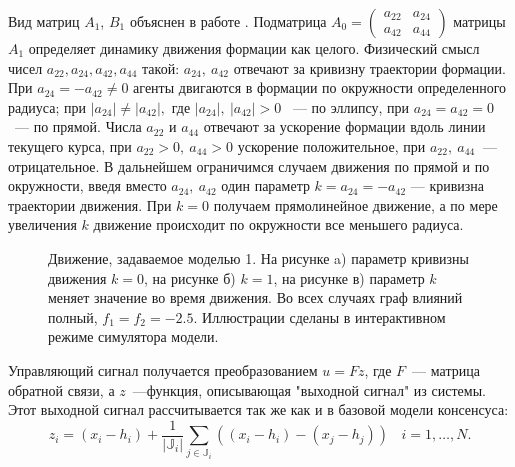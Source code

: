 Вид матриц $A_1$, $B_1$ объяснен в работе \cite{veerman2005flocks}. Подматрица 
$A_0=\left( \begin{array}{cc}
a_{22} & a_{24} \\
a_{42} & a_{44} \end{array} \right)$ 
матрицы $A_1$ определяет динамику движения формации как целого. Физический смысл чисел $a_{22},a_{24},a_{42},a_{44}$ такой: $a_{24},\ a_{42}$ отвечают за кривизну траектории формации. При $a_{24}=-a_{42}\neq 0$ агенты двигаются в формации по окружности определенного радиуса; при $|a_{24}|\neq|a_{42}|,$ где $|a_{24}|,\ |a_{42}|>0$ ~--- по эллипсу, при $a_{24}=a_{42}=0$~--- по прямой. Числа $a_{22}$ и $a_{44}$ отвечают за ускорение формации вдоль линии текущего курса, при $a_{22}>0,\ a_{44}>0$ ускорение положительное, при $a_{22},\ a_{44}~$ --- отрицательное. В дальнейшем ограничимся случаем движения по прямой и по окружности, введя вместо $a_{24},\ a_{42}$ один параметр $k=a_{24}=-a_{42}$ --- кривизна траектории движения. При $k=0$ получаем прямолинейное движение, а по мере увеличения $k$ движение происходит по окружности все меньшего радиуса.

\begin{figure}[h]
  \begin{minipage}[h]{0.32\linewidth}
  \end{minipage}
  \hfill
  \begin{minipage}[h]{0.32\linewidth}
  \end{minipage}
   \hfill
  \begin{minipage}[h]{0.32\linewidth}
  \end{minipage}
  \caption{Движение, задаваемое моделью 1. На рисунке a) параметр кривизны движения $k=0$, на рисунке б) $k=1$, на рисунке в) параметр $k$ меняет значение во время движения. Во всех случаях граф влияний полный, $f_1=f_2=-2.5$. Иллюстрации сделаны в интерактивном режиме симулятора модели.}
\label{fig:linear-motion}
\end{figure}

Управляющий сигнал получается преобразованием $u=Fz$, где $F$~--- матрица обратной связи, а $z$~---функция, описывающая "выходной сигнал" из системы. Этот выходной сигнал рассчитывается так же как и в базовой модели консенсуса:
$$
z_i=(x_i-h_i)+\frac{1}{|\mathbb{J}_i|}\sum_{j\in\mathbb{J}_i}\left((x_i-h_i)-(x_j-h_j)\right)\ \ \ \ i=1,\ldots,N.
$$

